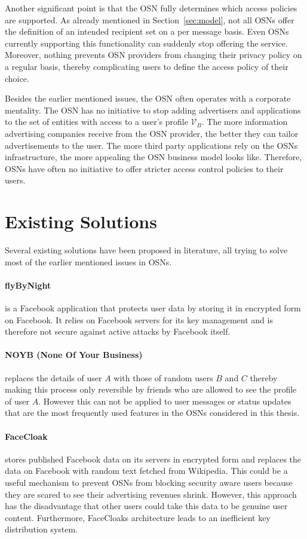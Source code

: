 Another significant point is that the OSN fully determines which access policies are supported. As already mentioned in Section~\ref{sec:model}, not all OSNs offer the definition of an intended recipient set on a per message basis. Even OSNs currently supporting this functionality can suddenly stop offering the service. Moreover, nothing prevents OSN providers from changing their privacy policy on a regular basis, thereby complicating users to define the access policy of their choice.

Besides the earlier mentioned issues, the OSN often operates with a corporate mentality. The OSN has no initiative to stop adding advertisers and applications to the set of entities with access to a user's profile $\mathcal{V}_B$. The more information advertising companies receive from the OSN provider, the better they can tailor advertisements to the user. The more third party applications rely on the OSNs infrastructure, the more appealing the OSN business model looks like. Therefore, OSNs have often no initiative to offer stricter access control policies to their users.

\section{Existing Solutions}
\label{sec:existing_solutions}
Several existing solutions have been proposed in literature, all trying to solve most of the earlier mentioned issues in OSNs.

\paragraph{flyByNight~\cite{art:LucasB09}} is a Facebook application that protects user data by storing it in encrypted form on Facebook. It relies on Facebook servers for its key management and is therefore not secure against active attacks by Facebook itself.

\paragraph{NOYB (None Of Your Business)~\cite{art:GuhaSTF08}} replaces the details of user $A$ with those of random users $B$ and $C$ thereby making this process only reversible by friends who are allowed to see the profile of user $A$. However this can not be applied to user messages or status updates that are the most frequently used features in the OSNs considered in this thesis.

\paragraph{FaceCloak~\cite{art:LuoXH09}} stores published Facebook data on its servers in encrypted form and replaces the data on Facebook with random text fetched from Wikipedia. This could be a useful mechanism to prevent OSNs from blocking security aware users because they are scared to see their advertising revenues shrink. However, this approach has the disadvantage that other users could take this data to be genuine user content. Furthermore, FaceCloaks architecture leads to an inefficient key distribution system.

